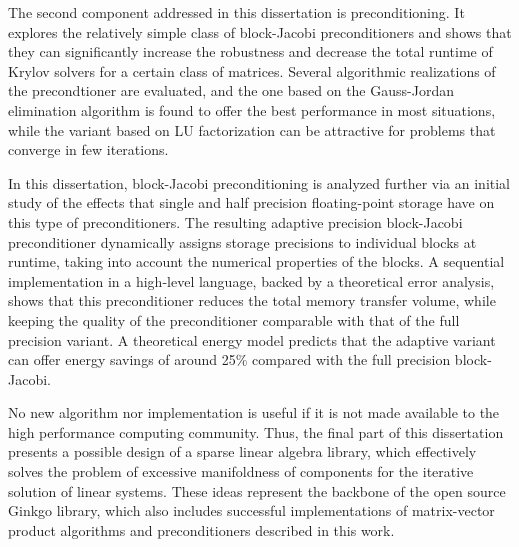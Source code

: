 The second component addressed in this dissertation is preconditioning. It
explores the relatively simple class of block-Jacobi preconditioners and shows
that they can significantly increase the robustness and decrease the total
runtime of Krylov solvers for a certain class of matrices. Several algorithmic
realizations of the precondtioner are evaluated, and the one based on the
Gauss-Jordan elimination algorithm is found to offer the best performance in
most situations, while the variant based on LU factorization can be attractive
for problems that converge in few iterations.

In this dissertation, block-Jacobi preconditioning is analyzed further via an
initial study of the effects that single and half precision floating-point
storage have on this type of preconditioners. The resulting adaptive precision
block-Jacobi preconditioner dynamically assigns storage precisions to individual
blocks at runtime, taking into account the numerical properties of the blocks. A
sequential implementation in a high-level language, backed by a theoretical
error analysis, shows that this preconditioner reduces the total memory transfer
volume, while keeping the quality of the preconditioner comparable with that of
the full precision variant. A theoretical energy model predicts that the
adaptive variant can offer energy savings of around 25\% compared with the full
precision block-Jacobi.

No new algorithm nor implementation is useful if it is not made available to the
high performance computing community. Thus, the final part of this dissertation
presents a possible design of a sparse linear algebra library, which effectively
solves the problem of excessive manifoldness of components for the iterative
solution of linear systems. These ideas represent the backbone of the open
source Ginkgo library, which also includes successful implementations of
matrix-vector product algorithms and preconditioners described in this work.
